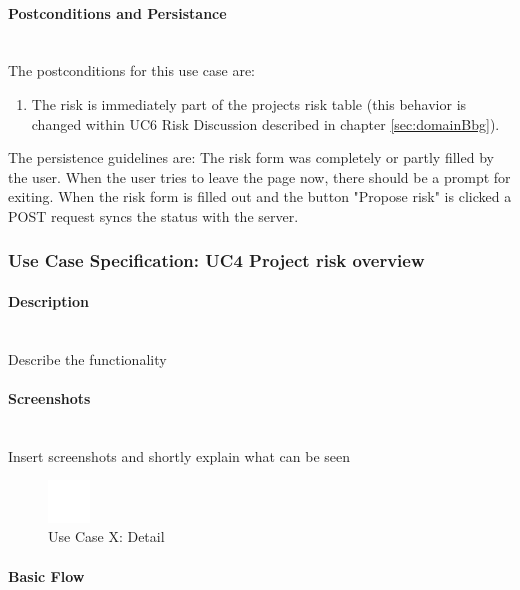 \paragraph*{Postconditions and Persistance}\mbox{}\\
The postconditions for this use case are:
\begin{enumerate}
	\vspace{-3mm}
	\setlength\itemsep{-1em}
	\item The risk is immediately part of the projects risk table (this behavior is changed within UC6 Risk Discussion described in chapter \ref{sec:domainBbg}).
\end{enumerate}

\noindent
The persistence guidelines are: 
\newline
\noindent
The risk form was completely or partly filled by the user. When the user tries to leave the page now, there should be a prompt for exiting. When the risk form is filled out and the button "Propose risk" is clicked a POST request syncs the status with the server.

\newpage
\subsubsection{Use Case Specification: \ac{UC}4 Project risk overview}
\label{sec:domainBbe}

\paragraph*{Description}\mbox{}\\
Describe the functionality

\paragraph*{Screenshots}\mbox{}\\
Insert screenshots and shortly explain what can be seen
\begin{figure}[h] 
	\centering
	\includegraphics[width=0.1\textwidth]{Content/Domain/placeholder.png}
	\caption{Use Case X: Detail}
	\label{fig:label4}
\end{figure}

\paragraph*{Basic Flow} \mbox{}\\

